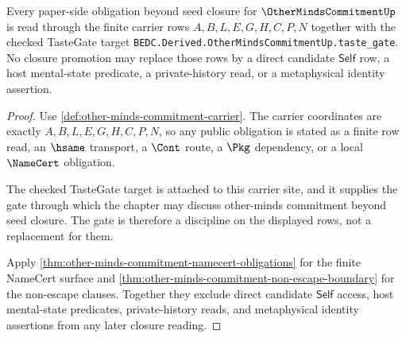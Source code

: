 \begin{theorem}
\label{thm:other-minds-commitment-taste-gate-obligation-boundary}
Every paper-side obligation beyond seed closure for $\OtherMindsCommitmentUp$
is read through the finite carrier rows $A,B,L,E,G,H,C,P,N$ together with the
checked TasteGate target
\texttt{BEDC.Derived.OtherMindsCommitmentUp.taste\_gate}.
No closure promotion may replace those rows by a direct candidate
$\mathsf{Self}$ row, a host mental-state predicate, a private-history read, or
a metaphysical identity assertion.
\end{theorem}
\begin{proof}
Use \autoref{def:other-minds-commitment-carrier}. The carrier coordinates are
exactly $A,B,L,E,G,H,C,P,N$, so any public obligation is stated as a finite row
read, an $\hsame$ transport, a $\Cont$ route, a $\Pkg$ dependency, or a local
$\NameCert$ obligation.

The checked TasteGate target is attached to this carrier site, and it supplies
the gate through which the chapter may discuss other-minds commitment beyond
seed closure. The gate is therefore a discipline on the displayed rows, not a
replacement for them.

Apply \autoref{thm:other-minds-commitment-namecert-obligations} for the finite
NameCert surface and \autoref{thm:other-minds-commitment-non-escape-boundary}
for the non-escape clauses. Together they exclude direct candidate
$\mathsf{Self}$ access, host mental-state predicates, private-history reads,
and metaphysical identity assertions from any later closure reading.
\end{proof}

